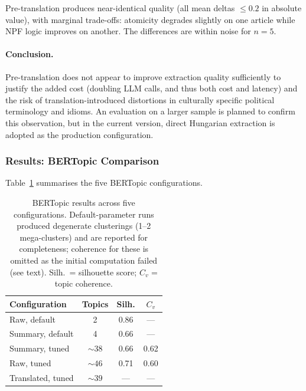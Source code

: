 \documentclass[10pt, a4paper]{article}
\begin{document}
Pre-translation produces near-identical quality (all mean deltas $\leq 0.2$ in absolute value), with marginal trade-offs: atomicity degrades slightly on one article while NPF logic improves on another. The differences are within noise for $n=5$.

\paragraph{Conclusion.}
Pre-translation does not appear to improve extraction quality sufficiently to justify the added cost (doubling LLM calls, and thus both cost and latency) and the risk of translation-introduced distortions in culturally specific political terminology and idioms. An evaluation on a larger sample is planned to confirm this observation, but in the current version, direct Hungarian extraction is adopted as the production configuration.


\subsubsection{Results: BERTopic Comparison}
\label{sec:results_bertopic}

Table~\ref{tab:bertopic} summarises the five BERTopic configurations.

\begin{table}[!ht]
\begin{center}
\begin{tabular}{lccc}
  \hline
  \textbf{Configuration} & \textbf{Topics} & \textbf{Silh.} & \textbf{$C_v$} \\
  \hline
  Raw, default       & 2   & 0.86 & --- \\
  Summary, default   & 4   & 0.66 & --- \\
  Summary, tuned     & ${\sim}38$  & 0.66 & 0.62 \\
  Raw, tuned          & ${\sim}46$  & 0.71 & 0.60 \\
  Translated, tuned  & ${\sim}39$  & --- & --- \\
  \hline
\end{tabular}
\caption{BERTopic results across five configurations. Default-parameter runs produced degenerate clusterings (1--2 mega-clusters) and are reported for completeness; coherence for these is omitted as the initial computation failed (see text). Silh.\ = silhouette score; $C_v$ = topic coherence.}
\label{tab:bertopic}
\end{center}
\end{table}
\end{document}
